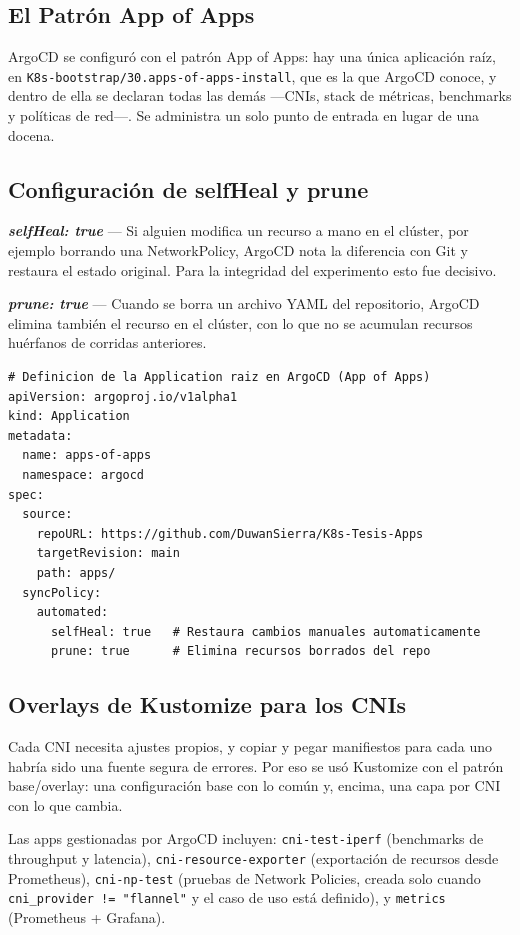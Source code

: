 \subsection{El Patrón App of Apps}

ArgoCD se configuró con el patrón App of Apps: hay una única aplicación raíz, en \texttt{K8s-bootstrap/30.apps-of-apps-install}, que es la que ArgoCD conoce, y dentro de ella se declaran todas las demás ---CNIs, stack de métricas, benchmarks y políticas de red---. Se administra un solo punto de entrada en lugar de una docena.

\subsection{Configuración de selfHeal y prune}

\textbf{\emph{selfHeal: true}} --- Si alguien modifica un recurso a mano en el clúster, por ejemplo borrando una NetworkPolicy, ArgoCD nota la diferencia con Git y restaura el estado original. Para la integridad del experimento esto fue decisivo.

\textbf{\emph{prune: true}} --- Cuando se borra un archivo YAML del repositorio, ArgoCD elimina también el recurso en el clúster, con lo que no se acumulan recursos huérfanos de corridas anteriores.

\begin{lstlisting}
# Definicion de la Application raiz en ArgoCD (App of Apps)
apiVersion: argoproj.io/v1alpha1
kind: Application
metadata:
  name: apps-of-apps
  namespace: argocd
spec:
  source:
    repoURL: https://github.com/DuwanSierra/K8s-Tesis-Apps
    targetRevision: main
    path: apps/
  syncPolicy:
    automated:
      selfHeal: true   # Restaura cambios manuales automaticamente
      prune: true      # Elimina recursos borrados del repo
\end{lstlisting}

\subsection{Overlays de Kustomize para los CNIs}

Cada CNI necesita ajustes propios, y copiar y pegar manifiestos para cada uno habría sido una fuente segura de errores. Por eso se usó Kustomize con el patrón base/overlay: una configuración base con lo común y, encima, una capa por CNI con lo que cambia.

Las apps gestionadas por ArgoCD incluyen: \texttt{cni-test-iperf} (benchmarks de throughput y latencia), \texttt{cni-resource-exporter} (exportación de recursos desde Prometheus), \texttt{cni-np-test} (pruebas de Network Policies, creada solo cuando \texttt{cni\_provider != "flannel"} y el caso de uso está definido), y \texttt{metrics} (Prometheus + Grafana).

